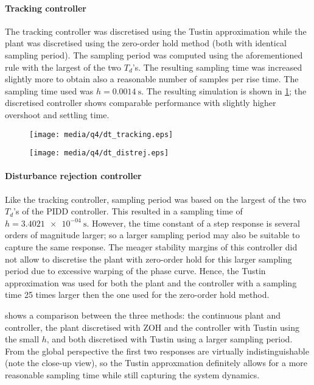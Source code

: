 \paragraph{Tracking controller}
The tracking controller was discretised using the Tustin approximation while the plant was discretised using the zero-order hold method (both with identical sampling period). The sampling period was computed using the aforementioned rule with the largest of the two $T_d$'s. The resulting sampling time was increased slightly more to obtain also a reasonable number of samples per rise time. The sampling time used was $h = \SI{0.0014}{\second}$. The resulting simulation is shown in \cref{fig:q4_dt_tracking}; the discretised controller shows comparable performance with slightly higher overshoot and settling time.
\begin{figure}[ht]
    \centering
    \texttt{[image: media/q4/dt\_tracking.eps]}
    \caption{}
    \label{fig:q4_dt_tracking}
\end{figure}

\begin{figure}[ht]
    \centering
    \texttt{[image: media/q4/dt\_distrej.eps]}
    \caption{}
    \label{fig:q4_dt_distrej}
\end{figure}
\paragraph{Disturbance rejection controller}
Like the tracking controller, sampling period was based on the largest of the two $T_d$'s of the PIDD controller. This resulted in a sampling time of $h = \SI{3.4021e-04}{\second}$. However, the time constant of a step response is several orders of magnitude larger; so a larger sampling period may also be suitable to capture the same response. The meager stability margins of this controller did not allow to discretise the plant with zero-order hold for this larger sampling period due to excessive warping of the phase curve. Hence, the Tustin approximation was used for both the plant and the controller with a sampling time 25 times larger then the one used for the zero-order hold method. 

 shows a comparison between the three methods: the continuous plant and controller, the plant discretised with ZOH and the controller with Tustin using the small $h$, and both discretised with Tustin using a larger sampling period. From the global perspective the first two responses are virtually indistinguishable (note the close-up view), so the Tustin approxmation definitely allows for a more reasonable sampling time while still capturing the system dynamics.